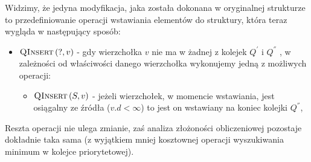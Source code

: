Widzimy, że jedyna modyfikacja, jaka została dokonana w oryginalnej strukturze to przedefiniowanie operacji wstawiania elementów do struktury, która teraz wygląda w następujący sposób:

\begin{itemize}
\item $\textrm{\textsc{QInsert}} \left( ?, v \right)$ - gdy wierzchołka $v$ nie ma w żadnej z kolejek $Q^{'}$ i $Q^{''}$ , w zależności od właściwości danego wierzchołka wykonujemy jedną z możliwych operacji:
\begin{itemize}
\item $\textrm{\textsc{QInsert}} \left( S, v \right) $ - jeżeli wierzchołek, w momencie wstawiania, jest osiągalny ze źródła ($v.d < \infty$) to jest on wstawiany na koniec kolejki $Q^{''}$,
\end{itemize}
\end{itemize}

Reszta operacji nie ulega zmianie, zaś analiza złożoności obliczeniowej pozostaje dokładnie taka sama (z wyjątkiem mniej kosztownej operacji wyszukiwania minimum w kolejce priorytetowej).

